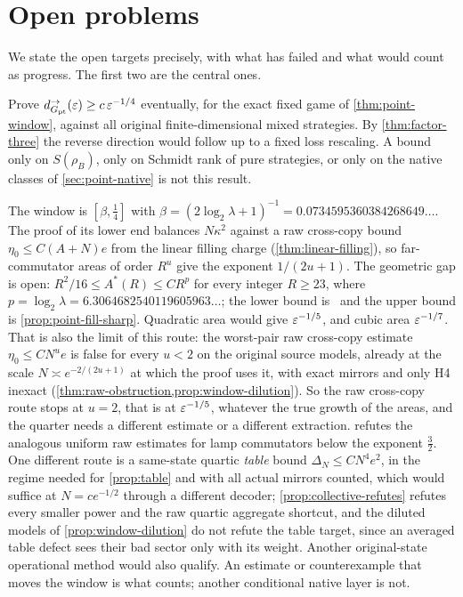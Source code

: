 \section{Open problems}\label{sec:open}

We state the open targets precisely, with what has failed and what would count as progress. The first two are the central ones.

\begin{problem}\label{prob:quarter}
Prove $d^\to_{G_{\mathrm{pt}}}(\varepsilon)\ge c\,\varepsilon^{-1/4}$ eventually, for the exact fixed game of \cref{thm:point-window}, against all original
finite-dimensional mixed strategies. By \cref{thm:factor-three} the reverse direction would follow up to a fixed loss rescaling. A bound
only on $S(\rho_B)$, only on Schmidt rank of pure strategies, or only on the native classes of \cref{sec:point-native} is not this result.
\end{problem}

The window is $[\beta,\frac14]$ with $\beta=(2\log_2\lambda+1)^{-1}=0.0734595360384268649\ldots$.
The proof of its lower end balances $N\kappa^2$ against a raw cross-copy bound $\eta_0\le C(A+N)e$ from the linear filling charge
(\cref{thm:linear-filling}), so far-commutator areas of order $R^u$ give the exponent $1/(2u+1)$.
The geometric gap is open: $R^2/16\le A^*(R)\le CR^p$ for every integer $R\ge23$, where $p=\log_2\lambda=6.3064682540119605963\ldots$;
the lower bound is~\cite[Proposition~3.4]{DM-H3} and the upper bound is \cref{prop:point-fill-sharp}.
Quadratic area would give $\varepsilon^{-1/5}$, and
cubic area $\varepsilon^{-1/7}$. That is also the limit of this route: the worst-pair raw cross-copy estimate $\eta_0\le CN^ue$ is false
for every $u<2$ on the original source models, already at the scale $N\asymp e^{-2/(2u+1)}$ at which the proof uses it, with exact
mirrors and only H4 inexact (\cref{thm:raw-obstruction,prop:window-dilution}). So the raw cross-copy route stops at $u=2$, that is at
$\varepsilon^{-1/5}$, whatever the true growth of the areas, and the quarter needs a different estimate or a different extraction.
 refutes the analogous uniform raw estimates for lamp commutators below the exponent $\frac32$. One different route
is a same-state quartic \emph{table} bound $\Delta_N\le CN^4e^2$, in the regime needed for \cref{prop:table} and with all actual mirrors
counted, which would suffice at $N=ce^{-1/2}$ through a different decoder; \cref{prop:collective-refutes} refutes every smaller power
and the raw quartic aggregate shortcut, and the diluted models of \cref{prop:window-dilution} do not refute the table target, since an
averaged table defect sees their bad sector only with its weight. Another original-state operational method would also qualify. An
estimate or counterexample that moves the window is what counts; another conditional native layer is not.

